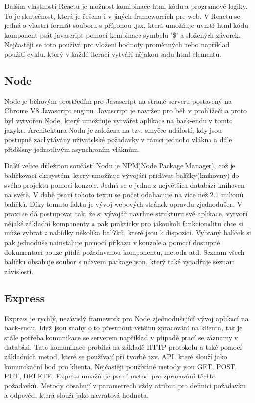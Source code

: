 Dalším vlastností Reactu je možnost komibinace html kódu a programové logiky. To je skutečnost, která je řešena i v jiných frameworcích pro web. V Reactu se jedná o vlastní formát souboru s příponou .jsx, která umožňuje uvnitř html kódu komponent psát javascript pomocí kombinace symbolu '\$' a složených závorek. Nejčastěji se toto používá pro vložení hodnoty proměnných nebo například použití cyklu, který v každé iteraci vytváří nějakou sadu html elementů. 



\subsection{Node}
Node je běhovým prostředím pro Javascript na straně serveru postavený na Chrome V8 Javascript enginu. Javascript je navržen pro běh v prohlížeči a proto byl vytvořen Node, který umožňuje vytvářet aplikace na back-endu v tomto jazyku. Architektura Nodu je založena na tzv. smyčce událostí, kdy jsou postupně zachytávány uživatelské požadavky v rámci jednoho vlákna a dále přiděleny jednotlivým asynchroním vláknům. 

Další velice důležitou součástí Nodu je NPM(Node Package Manager), což je balíčkovací ekosystém, který umožňuje vývojáři přidávat balíčky(knihovny) do svého projektu pomocí konzole. Jedná se o jednu z největších databází knihoven na světě. V době psaní tohoto textu se počet odahaduje na více než 2.1 milionů balíčků. Díky tomuto faktu je vývoj webových stránek opravdu zjednodušen. V praxi se dá postupovat tak, že si vývojář navrhne strukturu své aplikace, vytvoří nějaké základní komponenty a pak prakticky pro jakoukoli funkcionalitu chce si může vybrat z nabídky několika balíčků, které jsou k dispozici. Vybraný balíček si pak jednoduše nainstaluje pomocí příkazu v konzole a pomocí dostupné dokumentaci pouze přidá požadavanou komponentu, metodu atd. Seznam všech balíčku obsahuje soubor s názvem package.json, který také vyjadřuje seznam závislostí.  

\subsection{Express}
Express je rychlý, nezávislý framework pro Node zjednodušující vývoj aplikací na back-endu. Idyž jsou snahy o to přesunout většinu zpracování na klienta, tak je stále potřeba komunikace se serverem například v případě prací se záznamy v databázi. Tato komunikace probíhá na základě HTTP protokolu a také pomocí základních metod, které se používají při tvorbě tzv. API, které slouží jako komunikační bod pro klienta. Nejčastěji používáné metody jsou GET, POST, PUT, DELETE. Express umožňuje psaní metod pro zpracování těchto požadavků. Metody obsahují v parametrech vždy atribut pro definici požadavku a odpověď, která slouží jako navratová hodnota.   

